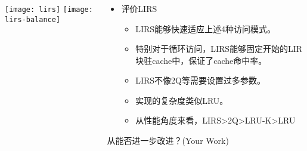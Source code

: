 \begin{frame}[plain]
	\frametitle{ }
	\begin{columns}
		\begin{column}{.3\textwidth}
			\centering
			\texttt{[image: lirs]}
			\texttt{[image: lirs-balance]}
		\end{column}
		
		\begin{column}{.6\textwidth}
			
			\begin{itemize}
				\item 评价LIRS
				\begin{itemize}
					\item LIRS能够快速适应上述4种访问模式。
					\item 特别对于循环访问，LIRS能够固定开始的LIR块驻cache中，保证了cache命中率。
					\item LIRS不像2Q等需要设置过多参数。
					\item 实现的复杂度类似LRU。
					\item  从性能角度来看，LIRS>2Q>LRU-K>LRU
					
				\end{itemize}
			\end{itemize}
			\centering
			\large 从能否进一步改进？(Your Work)
			
		\end{column}
		
		
	\end{columns}
\end{frame}



